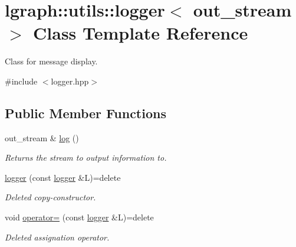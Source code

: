 \hypertarget{classlgraph_1_1utils_1_1logger}{}\section{lgraph\+:\+:utils\+:\+:logger$<$ out\+\_\+stream $>$ Class Template Reference}
\label{classlgraph_1_1utils_1_1logger}


Class for message display.  




{\ttfamily \#include $<$logger.\+hpp$>$}

\subsection*{Public Member Functions}
\begin{DoxyCompactItemize}
\item 
out\+\_\+stream \& \hyperlink{classlgraph_1_1utils_1_1logger_aa5458017ffc7b65faff47f55a056c2c5}{log} ()
\begin{DoxyCompactList}\small\item\em Returns the stream to output information to. \end{DoxyCompactList}\item 
\hyperlink{classlgraph_1_1utils_1_1logger_ad1e8cb0e83b2d9a90cbcd57e59fcca32}{logger} (const \hyperlink{classlgraph_1_1utils_1_1logger}{logger} \&L)=delete\hypertarget{classlgraph_1_1utils_1_1logger_ad1e8cb0e83b2d9a90cbcd57e59fcca32}{}\label{classlgraph_1_1utils_1_1logger_ad1e8cb0e83b2d9a90cbcd57e59fcca32}

\begin{DoxyCompactList}\small\item\em Deleted copy-\/constructor. \end{DoxyCompactList}\item 
void \hyperlink{classlgraph_1_1utils_1_1logger_aabccbc9d1ef5c0eb431eca9f08e4af12}{operator=} (const \hyperlink{classlgraph_1_1utils_1_1logger}{logger} \&L)=delete\hypertarget{classlgraph_1_1utils_1_1logger_aabccbc9d1ef5c0eb431eca9f08e4af12}{}\label{classlgraph_1_1utils_1_1logger_aabccbc9d1ef5c0eb431eca9f08e4af12}

\begin{DoxyCompactList}\small\item\em Deleted assignation operator. \end{DoxyCompactList}\end{DoxyCompactItemize}
